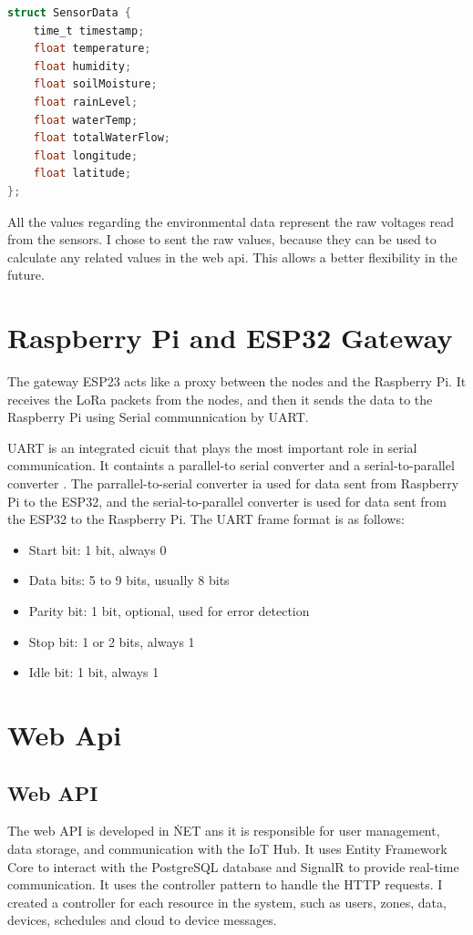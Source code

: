 \begin{lstlisting}[language=C, caption={Sensor reading structure}]
struct SensorData {
    time_t timestamp;
    float temperature;
    float humidity;
    float soilMoisture;
    float rainLevel;
    float waterTemp;
    float totalWaterFlow;
    float longitude;
    float latitude;
};
\end{lstlisting}

All the values regarding the environmental data represent the raw
voltages read from the sensors. I chose to sent the raw values, 
because they can be used to calculate any related values in the web api.
This allows a better flexibility in the future.

\section{Raspberry Pi and ESP32 Gateway}
The gateway ESP23 acts like a proxy between the nodes and the Raspberry Pi.
It receives the LoRa packets from the nodes, and then it sends the data to 
the Raspberry Pi using Serial communnication by UART.

UART is an integrated cicuit that plays the most important role in serial communication.
It containts a parallel-to serial converter and a serial-to-parallel converter\cite{uderstandingUart}
\cite{laddha2013review}. The 
parrallel-to-serial converter ia used for data sent from Raspberry Pi to the ESP32,
and the serial-to-parallel converter is used for data sent from the ESP32 to the Raspberry Pi.
The UART frame format is as follows:
\begin{itemize}
    \item Start bit: 1 bit, always 0
    \item Data bits: 5 to 9 bits, usually 8 bits
    \item Parity bit: 1 bit, optional, used for error detection
    \item Stop bit: 1 or 2 bits, always 1
    \item Idle bit: 1 bit, always 1
\end{itemize}

\section {Web Api}
\subsection{Web API}
The web API is developed in \.NET ans it is responsible
for user management, data storage, and communication with the IoT Hub.
It uses Entity Framework Core to interact with the 
PostgreSQL database and SignalR to provide real-time communication.
It uses the controller pattern to handle the HTTP requests. 
I created a controller for each resource in the system,
such as users, zones, data, devices, schedules and cloud to device messages.

